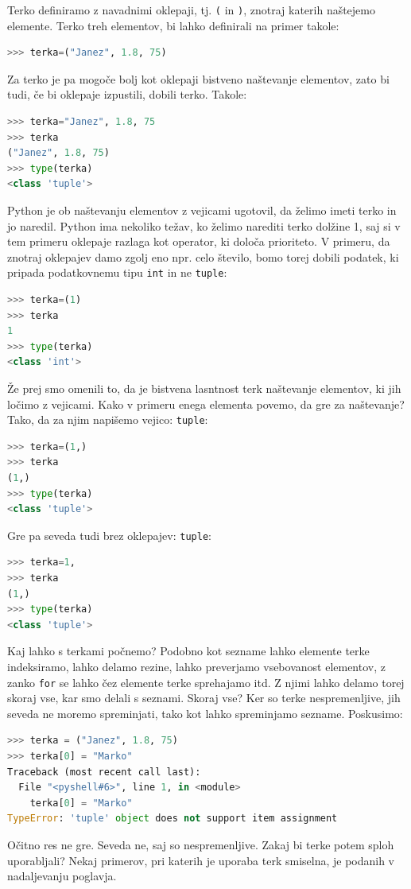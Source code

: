Terko definiramo z navadnimi oklepaji, tj. \texttt{(} in \texttt{)}, znotraj katerih naštejemo elemente. Terko treh elementov, bi lahko definirali na primer takole:
\begin{lstlisting}[language=Python]
>>> terka=("Janez", 1.8, 75)
\end{lstlisting}
Za terko je pa mogoče bolj kot oklepaji bistveno naštevanje elementov, zato bi tudi, če bi oklepaje izpustili, dobili terko. Takole:
\begin{lstlisting}[language=Python]
>>> terka="Janez", 1.8, 75
>>> terka
("Janez", 1.8, 75)
>>> type(terka)
<class 'tuple'>
\end{lstlisting}
Python je ob naštevanju elementov z vejicami ugotovil, da želimo imeti terko in jo naredil. Python ima nekoliko težav, ko želimo narediti terko dolžine 1, saj si v tem primeru oklepaje razlaga kot operator, ki določa prioriteto. V primeru, da znotraj oklepajev damo zgolj eno npr. celo število, bomo torej dobili podatek, ki pripada podatkovnemu tipu \texttt{int} in ne \texttt{tuple}:
\begin{lstlisting}[language=Python]
>>> terka=(1)
>>> terka
1
>>> type(terka)
<class 'int'>
\end{lstlisting}
Že prej smo omenili to, da je bistvena lasntnost terk naštevanje elementov, ki jih ločimo z vejicami. Kako v primeru enega elementa povemo, da gre za naštevanje? Tako, da za njim napišemo vejico:
\texttt{tuple}:
\begin{lstlisting}[language=Python]
>>> terka=(1,)
>>> terka
(1,)
>>> type(terka)
<class 'tuple'>
\end{lstlisting}
Gre pa seveda tudi brez oklepajev:
\texttt{tuple}:
\begin{lstlisting}[language=Python]
>>> terka=1,
>>> terka
(1,)
>>> type(terka)
<class 'tuple'>
\end{lstlisting}

Kaj lahko s terkami počnemo? Podobno kot sezname lahko elemente terke indeksiramo, lahko delamo rezine, lahko preverjamo vsebovanost elementov, z zanko \texttt{for} se lahko čez elemente terke sprehajamo itd. Z njimi lahko delamo torej skoraj vse, kar smo delali s seznami. Skoraj vse? Ker so terke nespremenljive, jih seveda ne moremo spreminjati, tako kot lahko spreminjamo sezname. Poskusimo:
\begin{lstlisting}[language=Python]
>>> terka = ("Janez", 1.8, 75)
>>> terka[0] = "Marko"
Traceback (most recent call last):
  File "<pyshell#6>", line 1, in <module>
    terka[0] = "Marko"
TypeError: 'tuple' object does not support item assignment
\end{lstlisting}
Očitno res ne gre. Seveda ne, saj so nespremenljive. Zakaj bi terke potem sploh uporabljali? Nekaj primerov, pri katerih je uporaba terk smiselna, je podanih v nadaljevanju poglavja.

